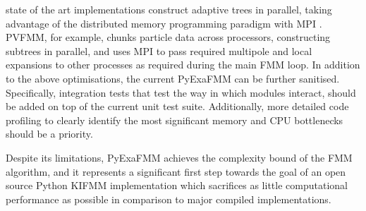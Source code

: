 state of the art implementations construct adaptive trees in parallel, taking
advantage of the distributed memory programming paradigm with \gls{MPI} \cite{Malhotra:2015:CCP}.
PVFMM, for example, chunks particle data across processors, constructing subtrees in parallel,
and uses \gls{MPI} to pass required multipole and local expansions to other processes
as required during the main \gls{FMM} loop. In addition to the above optimisations,
the current \gls{PyExaFMM} can be further sanitised. Specifically, integration tests
that test the way in which modules interact, should be added on top of the current
unit test suite. Additionally, more detailed code profiling to clearly identify
the most significant memory and \gls{CPU} bottlenecks should be a priority.

Despite its limitations, \gls{PyExaFMM} achieves the complexity bound of the
\gls{FMM} algorithm, and it represents a significant first step towards the goal
of an open source Python \gls{KIFMM} implementation which sacrifices as little
computational performance as possible in comparison to major compiled implementations.
